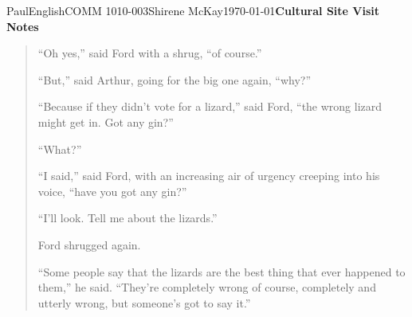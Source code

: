 \documentclass[12pt,letterpaper]{article}
\begin{document}
\begin{mla}{Paul}{English}{COMM 1010-003}{Shirene
    McKay}{\today}{\textbf{Cultural Site Visit Notes}}
\begin{quotation}
``Oh yes,'' said Ford with a shrug, ``of course.''

``But,'' said Arthur, going for the big one again, ``why?''

``Because if they didn't vote for a lizard,'' said Ford, ``the wrong
lizard might get in. Got any gin?''

``What?''

``I said,'' said Ford, with an increasing air of urgency creeping into
his voice, ``have you got any gin?''

``I'll look. Tell me about the lizards.''

Ford shrugged again.

``Some people say that the lizards are the best thing that ever
happened to them,'' he said. ``They're completely wrong of course,
completely and utterly wrong, but someone's got to say it.''
\end{quotation}

\end{mla}
\end{document}
